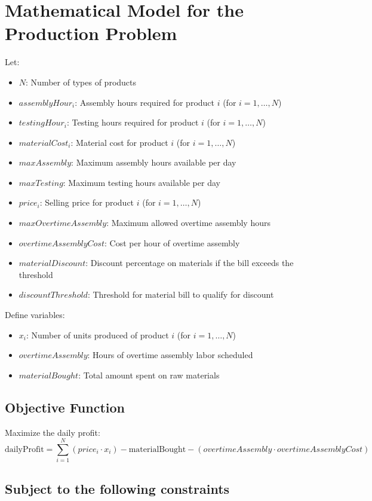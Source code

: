 \documentclass{article}
\begin{document}
\section*{Mathematical Model for the Production Problem}

Let:
\begin{itemize}
    \item $N$: Number of types of products
    \item $assemblyHour_i$: Assembly hours required for product $i$ (for $i=1, \ldots, N$)
    \item $testingHour_i$: Testing hours required for product $i$ (for $i=1, \ldots, N$)
    \item $materialCost_i$: Material cost for product $i$ (for $i=1, \ldots, N$)
    \item $maxAssembly$: Maximum assembly hours available per day
    \item $maxTesting$: Maximum testing hours available per day
    \item $price_i$: Selling price for product $i$ (for $i=1, \ldots, N$)
    \item $maxOvertimeAssembly$: Maximum allowed overtime assembly hours
    \item $overtimeAssemblyCost$: Cost per hour of overtime assembly
    \item $materialDiscount$: Discount percentage on materials if the bill exceeds the threshold
    \item $discountThreshold$: Threshold for material bill to qualify for discount
\end{itemize}

Define variables:
\begin{itemize}
    \item $x_i$: Number of units produced of product $i$ (for $i=1, \ldots, N$)
    \item $overtimeAssembly$: Hours of overtime assembly labor scheduled
    \item $materialBought$: Total amount spent on raw materials
\end{itemize}

\subsection*{Objective Function}
Maximize the daily profit:
\[
\text{dailyProfit} = \sum_{i=1}^{N} (price_i \cdot x_i) - \text{materialBought} - (overtimeAssembly \cdot overtimeAssemblyCost)
\]

\subsection*{Subject to the following constraints}
\end{document}
